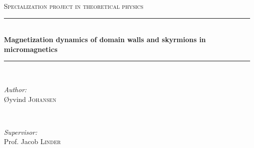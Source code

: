 \documentclass[12pt, a4paper, twoside, openright]{article}		%
\numberwithin{equation}{section}
\begin{document}
\begin{titlepage}

\newcommand{\HRule}{\rule{\linewidth}{0.5mm}} %

\center %
 

\textsc{\Large Specialization project in theoretical physics}\\[0.5cm] %


\HRule \\[0.4cm]
{ \huge \bfseries Magnetization dynamics of domain walls and skyrmions in micromagnetics}\\[0.4cm] %
\HRule \\[1.5cm]
 

\begin{minipage}{0.4\textwidth}
\begin{flushleft} \large
\emph{Author:}\\
\O yvind \textsc{Johansen} %
\end{flushleft}
\end{minipage}
~
\begin{minipage}{0.4\textwidth}
\begin{flushright} \large
\emph{Supervisor:} \\
Prof. Jacob \textsc{Linder} %
\end{flushright}
\end{minipage}\\[4cm]


\end{titlepage}
\end{document}

